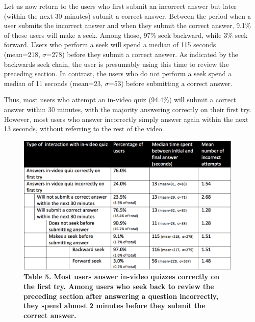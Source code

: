 \documentclass{sigchi}
\begin{document}
Let us now return to the users who first submit an incorrect answer but later (within the next 30 minutes) submit a correct answer. Between the period when a user submits the incorrect answer and when they submit the correct answer, 9.1\% of these users will make a seek. Among those, 97\% seek backward, while 3\% seek forward. Users who perform a seek will spend a median of 115 seconds (mean=218, $\sigma$=278) before they submit a correct answer. As indicated by the backwards seek chain, the user is presumably using this time to review the preceding section. In contrast, the users who do not perform a seek spend a median of 11 seconds (mean=23, $\sigma$=53) before submitting a correct answer.

Thus, most users who attempt an in-video quiz (94.4\%) will submit a correct answer within 30 minutes, with the majority answering correctly on their first try.  However, most users who answer incorrectly simply answer again within the next 13 seconds, without referring to the rest of the video. %

\begin{figure}
\includegraphics[width=1.0\columnwidth]{time-spent-on-quizzes}
\small{\textbf{Table 5. Most users answer in-video quizzes correctly on the first try. Among users who seek back to review the preceding section after answering a question incorrectly, they spend almost 2 minutes before they submit the correct answer.}}
\label{fig:time-spent-on-quizzes}
\end{figure}
\end{document}
